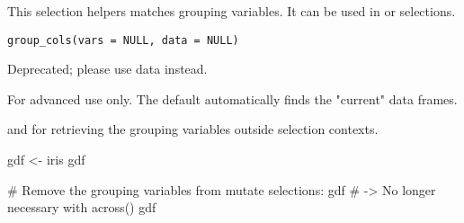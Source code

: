 \documentclass[a4paper]{book}
\begin{document}
%
\begin{Description}
This selection helpers matches grouping variables. It can be used
in  or  selections.
\end{Description}
%
\begin{Usage}
\begin{verbatim}
group_cols(vars = NULL, data = NULL)
\end{verbatim}
\end{Usage}
%
\begin{Arguments}
\begin{ldescription}
\item[\code{vars}] Deprecated; please use data instead.

\item[\code{data}] For advanced use only. The default  automatically
finds the "current" data frames.
\end{ldescription}
\end{Arguments}
%
\begin{SeeAlso}
 and  for retrieving the grouping
variables outside selection contexts.
\end{SeeAlso}
%
\begin{Examples}
\begin{ExampleCode}
gdf <- iris %
gdf %

# Remove the grouping variables from mutate selections:
gdf %
# -> No longer necessary with across()
gdf %
\end{ExampleCode}
\end{Examples}
%
\end{document}
